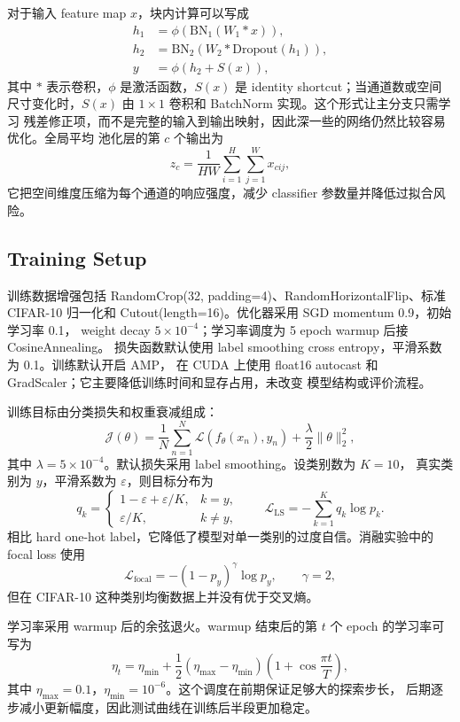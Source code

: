 \documentclass[11pt,a4paper]{ctexart}
\begin{document}
对于输入 feature map $x$，块内计算可以写成
\[
\begin{aligned}
h_1 &= \phi\!\left(\mathrm{BN}_1(W_1 * x)\right), \\
h_2 &= \mathrm{BN}_2\!\left(W_2 * \mathrm{Dropout}(h_1)\right), \\
y &= \phi\!\left(h_2 + S(x)\right),
\end{aligned}
\]
其中 $*$ 表示卷积，$\phi$ 是激活函数，$S(x)$ 是 identity shortcut；当通道数或空间
尺寸变化时，$S(x)$ 由 $1\times1$ 卷积和 BatchNorm 实现。这个形式让主分支只需学习
残差修正项，而不是完整的输入到输出映射，因此深一些的网络仍然比较容易优化。全局平均
池化层的第 $c$ 个输出为
\[
z_c = \frac{1}{HW}\sum_{i=1}^{H}\sum_{j=1}^{W} x_{cij},
\]
它把空间维度压缩为每个通道的响应强度，减少 classifier 参数量并降低过拟合风险。

\subsection{Training Setup}

训练数据增强包括 RandomCrop(32, padding=4)、RandomHorizontalFlip、标准 CIFAR-10
归一化和 Cutout(length=16)。优化器采用 SGD momentum 0.9，初始学习率 0.1，
weight decay $5\times10^{-4}$；学习率调度为 5 epoch warmup 后接 CosineAnnealing。
损失函数默认使用 label smoothing cross entropy，平滑系数为 0.1。训练默认开启 AMP，
在 CUDA 上使用 float16 autocast 和 GradScaler；它主要降低训练时间和显存占用，未改变
模型结构或评价流程。

训练目标由分类损失和权重衰减组成：
\[
\mathcal{J}(\theta)
= \frac{1}{N}\sum_{n=1}^{N}\mathcal{L}\!\left(f_{\theta}(x_n), y_n\right)
  + \frac{\lambda}{2}\lVert\theta\rVert_2^2,
\]
其中 $\lambda=5\times10^{-4}$。默认损失采用 label smoothing。设类别数为 $K=10$，
真实类别为 $y$，平滑系数为 $\varepsilon$，则目标分布为
\[
q_k =
\begin{cases}
1-\varepsilon + \varepsilon/K, & k = y,\\
\varepsilon/K, & k \ne y,
\end{cases}
\qquad
\mathcal{L}_{\mathrm{LS}}
= -\sum_{k=1}^{K} q_k \log p_k .
\]
相比 hard one-hot label，它降低了模型对单一类别的过度自信。消融实验中的 focal loss
使用
\[
\mathcal{L}_{\mathrm{focal}}
= -(1-p_y)^{\gamma}\log p_y,\qquad \gamma=2,
\]
但在 CIFAR-10 这种类别均衡数据上并没有优于交叉熵。

学习率采用 warmup 后的余弦退火。warmup 结束后的第 $t$ 个 epoch 的学习率可写为
\[
\eta_t
= \eta_{\min}
 + \frac{1}{2}(\eta_{\max}-\eta_{\min})
 \left(1+\cos\frac{\pi t}{T}\right),
\]
其中 $\eta_{\max}=0.1$，$\eta_{\min}=10^{-6}$。这个调度在前期保证足够大的探索步长，
后期逐步减小更新幅度，因此测试曲线在训练后半段更加稳定。
\end{document}
